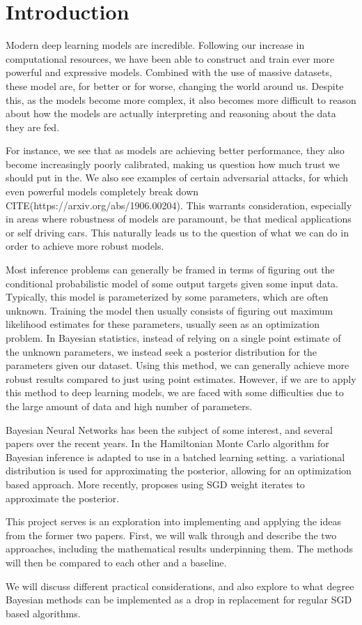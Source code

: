 \chapter{Introduction}
Modern deep learning models are incredible.
Following our increase in computational resources, we have been able to construct and train ever more powerful and expressive models.
Combined with the use of massive datasets, these model are, for better or for worse, changing the world around us. 
Despite this, as the models become more complex, it also becomes more difficult to reason about how the models are actually interpreting and reasoning about the data they are fed.

For instance, we see that as models are achieving better performance, they also become increasingly poorly calibrated\cite{guo_calibration_2017}, making us question how much trust we should put in the. 
We also see examples of certain adversarial attacks, for which even powerful models completely break down CITE(https://arxiv.org/abs/1906.00204).
This warrants consideration, especially in areas where robustness of models are paramount, be that medical applications or self driving cars. 
This naturally leads us to the question of what we can do in order to achieve more robust models.

Most inference problems can generally be framed in terms of figuring out the conditional probabilistic model of some output targets given some input data.
Typically, this model is parameterized by some parameters, which are often unknown.
Training the model then usually consists of figuring out maximum likelihood estimates for these parameters, usually seen as an optimization problem.
In Bayesian statistics, instead of relying on a single point estimate of the unknown parameters, we instead seek a posterior distribution for the parameters given our dataset.
Using this method, we can generally achieve more robust results compared to just using point estimates. 
However, if we are to apply this method to deep learning models, we are faced with some difficulties due to the large amount of data and high number of parameters.

Bayesian Neural Networks has been the subject of some interest, and several papers over the recent years. 
In \cite{chen_stochastic_2014} the Hamiltonian Monte Carlo algorithm for Bayesian inference is adapted to use in a batched learning setting. 
\cite{blundell_weight_2015} a variational distribution is used for approximating the posterior, allowing for an optimization based approach.
More recently, \cite{wilson_bayesian_2019} proposes using SGD weight iterates to approximate the posterior.

This project serves is an exploration into implementing and applying the ideas from the former two papers.
First, we will walk through and describe the two approaches, including the mathematical results underpinning them.
The methods will then be compared to each other and a baseline.

We will discuss different practical considerations, and also explore to what degree Bayesian methods can be implemented as a drop in replacement for regular SGD based algorithms.
